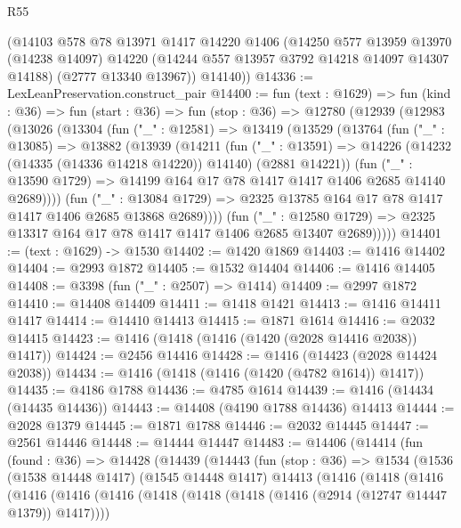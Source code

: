 \begin{lexlean}{R55}
\begin{coremodule}
{{      (@14103
        @578
        @78
        @13971
        @1417
        @14220
        @1406
        (@14250
          @577
          @13959
          @13970
          (@14238 @14097)
          @14220
          (@14244 @557 @13957 @3792 @14218 @14097 @14307 @14188)
          (@2777 @13340 @13967))
        @14140))
@14336 := LexLeanPreservation.construct_pair
@14400 := fun (text : @1629) =>
  fun (kind : @36) =>
  fun (start : @36) =>
  fun (stop : @36) =>
  @12780
    (@12939
      (@12983
        (@13026
          (@13304
            (fun ("_" : @12581) =>
            @13419
              (@13529
                (@13764
                  (fun ("_" : @13085) =>
                  @13882
                    (@13939
                      (@14211
                        (fun ("_" : @13591) =>
                        @14226 (@14232 (@14335 (@14336 @14218 @14220)) @14140) (@2881 @14221))
                        (fun ("_" : @13590 @1729) =>
                        @14199 @164 @17 @78 @1417 @1417 @1406 @2685 @14140 @2689))))
                  (fun ("_" : @13084 @1729) =>
                  @2325 @13785 @164 @17 @78 @1417 @1417 @1406 @2685 @13868 @2689))))
            (fun ("_" : @12580 @1729) =>
            @2325 @13317 @164 @17 @78 @1417 @1417 @1406 @2685 @13407 @2689)))))
@14401 := (text : @1629) -> @1530
@14402 := @1420 @1869
@14403 := @1416 @14402
@14404 := @2993 @1872
@14405 := @1532 @14404
@14406 := @1416 @14405
@14408 := @3398 (fun ("_" : @2507) => @1414)
@14409 := @2997 @1872
@14410 := @14408 @14409
@14411 := @1418 @1421
@14413 := @1416 @14411 @1417
@14414 := @14410 @14413
@14415 := @1871 @1614
@14416 := @2032 @14415
@14423 := @1416 (@1418 (@1416 (@1420 (@2028 @14416 @2038)) @1417))
@14424 := @2456 @14416
@14428 := @1416 (@14423 (@2028 @14424 @2038))
@14434 := @1416 (@1418 (@1416 (@1420 (@4782 @1614)) @1417))
@14435 := @4186 @1788
@14436 := @4785 @1614
@14439 := @1416 (@14434 (@14435 @14436))
@14443 := @14408 (@4190 @1788 @14436) @14413
@14444 := @2028 @1379
@14445 := @1871 @1788
@14446 := @2032 @14445
@14447 := @2561 @14446
@14448 := @14444 @14447
@14483 := @14406
    (@14414
      (fun (found : @36) =>
      @14428
        (@14439
          (@14443
            (fun (stop : @36) =>
            @1534
              (@1536
                (@1538 @14448 @1417)
                (@1545 @14448 @1417)
                @14413
                (@1416
                  (@1418
                    (@1416
                      (@1416
                        (@1416
                          (@1416
                            (@1418 (@1418 (@1418 (@1416 (@2914 (@12747 @14447 @1379)) @1417))))
}}
\end{coremodule}
\end{lexlean}
